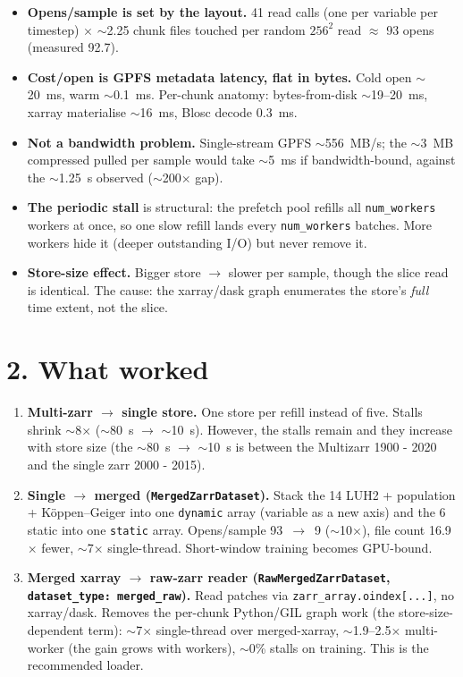 \documentclass[11pt,a4paper]{article}
\newcommand{\x}{$\times$}
\newcommand{\ra}{$\to$}
\begin{document}
\begin{itemize}
  \item \textbf{Opens/sample is set by the layout.} 41 read calls (one per variable per timestep)
    \x{} $\sim$2.25 chunk files touched per random $256^2$ read $\approx$ 93 opens (measured 92.7).
  \item \textbf{Cost/open is GPFS metadata latency, flat in bytes.} Cold open $\sim$20~ms, warm
    $\sim$0.1~ms. Per-chunk anatomy: bytes-from-disk $\sim$19--20~ms, xarray materialise $\sim$16~ms,
    Blosc decode 0.3~ms.
  \item \textbf{Not a bandwidth problem.} Single-stream GPFS $\sim$556~MB/s; the $\sim$3~MB compressed
    pulled per sample would take $\sim$5~ms if bandwidth-bound, against the $\sim$1.25~s observed
    ($\sim$200\x{} gap).
  \item \textbf{The periodic stall} is structural: the prefetch pool refills all \texttt{num\_workers}
    workers at once, so one slow refill lands every \texttt{num\_workers} batches. More workers hide it
    (deeper outstanding I/O) but never remove it.
  \item \textbf{Store-size effect.} Bigger store \ra{} slower per sample, though the slice read is
    identical. The cause: the xarray/dask graph enumerates the store's \emph{full} time extent, not
    the slice.
\end{itemize}

\section*{2. What worked}

\begin{enumerate}
  \item \textbf{Multi-zarr \ra{} single store.} One store per refill instead of five.
    Stalls shrink $\sim$8\x{} ($\sim$80~s \ra{} $\sim$10~s). However, the stalls remain and they
    increase with store size (the $\sim$80~s \ra{} $\sim$10~s is between the Multizarr 1900 - 2020
    and the single zarr 2000 - 2015).
  \item \textbf{Single \ra{} merged (\texttt{MergedZarrDataset}).} Stack the 14 LUH2 + population +
    K\"oppen--Geiger into one \texttt{dynamic} array (variable as a new axis) and the 6 static into one
    \texttt{static} array. Opens/sample 93~\ra{}~9 ($\sim$10\x{}), file count 16.9\x{} fewer,
    $\sim$7\x{} single-thread. Short-window training becomes GPU-bound.
  \item \textbf{Merged xarray \ra{} raw-zarr reader (\texttt{RawMergedZarrDataset},
    \texttt{dataset\_type: merged\_raw}).} Read patches via \texttt{zarr\_array.oindex[...]}, no
    xarray/dask. Removes the per-chunk Python/GIL graph work (the store-size-dependent term):
    $\sim$7\x{} single-thread over merged-xarray, $\sim$1.9--2.5\x{} multi-worker (the gain grows with
    workers), $\sim$0\% stalls on training. This is the recommended loader.
\end{enumerate}
\end{document}

